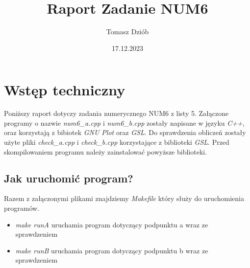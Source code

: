 \documentclass{article}
\title{Raport Zadanie NUM6}
\date{17.12.2023}
\author{Tomasz Dziób}
\begin{document}
  \maketitle
  \newpage
  \section{Wstęp techniczny}
  Poniższy raport dotyczy zadania numerycznego NUM6 z listy 5. Załączone programy o nazwie \textit{num6\_a.cpp} i \textit{num6\_b.cpp} zostały napisane w języku \textit{C++}, oraz korzystają z bibiotek \textit{GNU Plot} oraz \textit{GSL}. Do sprawdzenia obliczeń zostały użyte pliki \textit{check\_a.cpp} i \textit{check\_b.cpp} korzystające z biblioteki \textit{GSL}. Przed skompilowaniem programu należy zainstalować powyższe biblioteki.

    \subsection{Jak uruchomić program?}
    Razem z załączonymi plikami znajdziemy \textit{Makefile} który służy do uruchomienia programów.
    \begin{itemize}
      \item \textit{make runA} uruchamia program dotyczący podpunktu a wraz ze sprawdzeniem 
      \item \textit{make runB} uruchamia program dotyczący podpunktu b wraz ze sprawdzeniem 
  \end{itemize}
\end{document}

